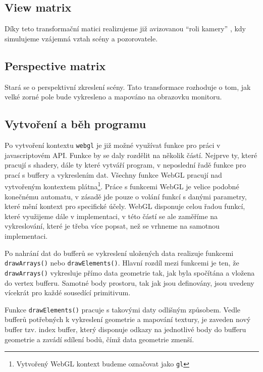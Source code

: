 \subsection{View matrix}
Díky teto transformační matici realizujeme již avizovanou ``roli kamery'' , kdy simulujeme vzájemná vztah scény a pozorovatele.

\subsection{Perspective matrix}
Stará se o perspektivní zkreslení scény. Tato transformace rozhoduje o tom, jak velké zorné pole bude vykresleno a mapováno 
na obrazovku monitoru. 

\newpage

\subsection{Vytvoření a běh programu}
Po vytvoření kontextu \texttt{webgl} je již možné využívat funkce pro práci v javascriptovém API. Funkce by se daly rozdělit na několik částí. Nejprve ty, které pracují s shadery, dále ty které vytváří program, v neposlední řadě funkce pro prací s buffery a vykreslením dat. Všechny funkce WebGL pracují nad vytvořeným kontextem plátna\footnote{Vytvořený WebGL kontext budeme označovat jako \texttt{gl}}. Práce s funkcemi WebGL je velice podobné konečnému automatu, v zásadě jde pouze o volání funkcí s danými parametry, které mění kontext pro specifické účely. WebGL disponuje celou řadou funkcí, které využijeme dále v implementaci, v této částí se ale zaměříme na vykreslování, které je třeba více popsat, než se vrhneme na samotnou implementaci. 

Po nahrání dat do bufferů se vykreslení uložených data realizuje funkcemi \texttt{drawArrays()} nebo \texttt{drawElements()}. Hlavní rozdíl mezi funkcemi je ten, že \texttt{drawArrays()} vykresluje přímo data geometrie tak,  jak byla spočítána a vložena do vertex bufferu. Samotné body prostoru, tak jak jsou definovány, jsou uvedeny vícekrát pro každé sousedící primitivum.

Funkce \texttt{drawElements()} pracuje s takovými daty odlišným způsobem. Vedle bufferů potřebných k vykreslení geometrie a mapování textury, je zaveden nový buffer tzv. index buffer, který disponuje odkazy na jednotlivé body do bufferu geometrie a zavádí sdílení bodů, čímž data geometrie zmenší. 

